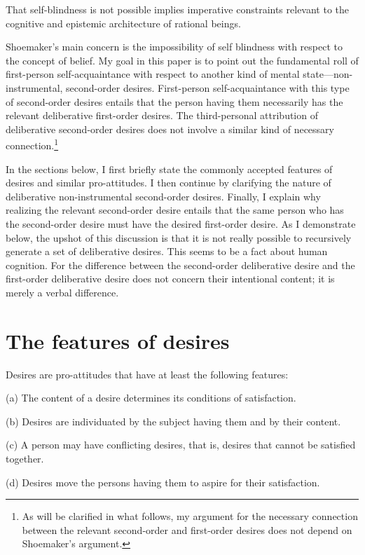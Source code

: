 \documentclass[output=paper,colorlinks,citecolor=brown
]{langscibook}
\begin{document}
\hfill \break

That self-blindness is not possible implies imperative constraints relevant to the cognitive and epistemic architecture of rational beings.

Shoemaker’s main concern is the impossibility of self blindness with respect to the concept of belief. My goal in this paper is to point out the fundamental roll of first-person self-acquaintance with respect to another kind of mental state—non-instrumental, second-order desires. First-person self-acquaintance with this type of second-order desires entails that the person having them necessarily has the relevant deliberative first-order desires. The third-personal attribution of deliberative second-order desires does not involve a similar kind of necessary connection.\footnote{As will be clarified in what follows, my argument for the necessary connection between the relevant second-order and first-order desires does not depend on Shoemaker's argument.}
	
	In the sections below, I first briefly state the commonly accepted features of desires and similar pro-attitudes. I then continue by clarifying the nature of deliberative non-instrumental second-order desires. Finally, I explain why realizing the relevant second-order desire entails that the same person who has the second-order desire must have the desired first-order desire. As I demonstrate below, the upshot of this discussion is that it is not really possible to recursively generate a set of deliberative desires. This seems to be a fact about human cognition. For the difference between the second-order deliberative desire and the first-order deliberative desire does not concern their intentional content; it is merely a verbal difference.
	
	\section{The features of desires}
Desires are pro-attitudes that have at least the following features:

(a)	The content of a desire determines its conditions of satisfaction. 

(b)	Desires are individuated by the subject having them and by their content.

(c)	A person may have conflicting desires, that is, desires that cannot be satisfied together. 

(d)	Desires move the persons having them to aspire for their satisfaction.
\end{document}
